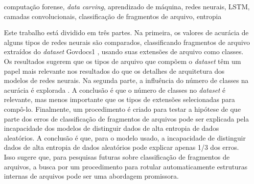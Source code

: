 \begin{resumo}{computação forense, \textit{data carving}, aprendizado de máquina, redes neurais, LSTM, camadas convolucionais, classificação de fragmentos de arquivo, entropia}

Este trabalho está dividido em três partes.
Na primeira, os valores de acurácia de alguns tipos de redes neurais são comparados, classificando fragmentos de arquivo extraídos do \textit{dataset} Govdocs1 \cite{garfinkel_bringing_2009}, usando suas extensões de arquivo como classes.
Os resultados sugerem que os tipos de arquivo que compõem o \textit{dataset} têm um papel mais relevante nos resultados do que os detalhes de arquitetura dos modelos de redes neurais.
Na segunda parte, a influência do número de classes na acurácia é explorada .
A conclusão é que o número de classes no \textit{dataset} é relevante, mas menos importante que os tipos de extensões selecionadas para compô-lo.
Finalmente, um procedimento é criado para testar a hipótese de que parte dos erros de classificação de fragmentos de arquivos pode ser explicada pela incapacidade dos modelos de distinguir dados de alta entropia de dados aleatórios.
A conclusão é que, para o modelo usado, a incapacidade de distinguir dados de alta entropia de dados aleatórios pode explicar apenas 1/3 dos erros.
Isso sugere que, para pesquisas futuras sobre classificação de fragmentos de arquivos, a busca por um procedimento para rotular automaticamente estruturas internas de arquivos pode ser uma abordagem promissora.

\end{resumo}



